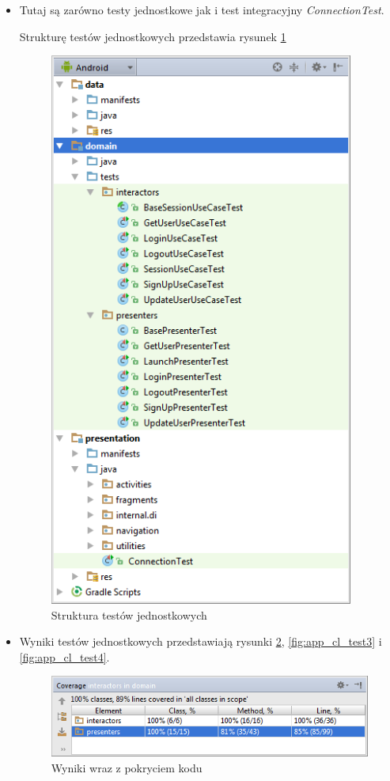 \begin{itemize}
\item
Tutaj są zarówno testy jednostkowe jak i test integracyjny \textit{ConnectionTest}.

Strukturę testów jednostkowych przedstawia rysunek \ref{fig:app_cl_test1}
\begin{figure}[!htb]
    \centering
    \includegraphics[width=10cm]{imgs/ch6_app_cl_test1.png}
    \caption
{Struktura testów jednostkowych}
    \label{fig:app_cl_test1}
\end{figure} 

\item
Wyniki testów jednostkowych przedstawiają rysunki \ref{fig:app_cl_test5}, \ref{fig:app_cl_test3} i \ref{fig:app_cl_test4}.

\begin{figure}[!htb]
    \centering
    \includegraphics[width=12cm]{imgs/ch6_app_cl_test5.png}
    \caption
{Wyniki wraz z pokryciem kodu}
    \label{fig:app_cl_test5}
\end{figure} 


\end{itemize}
